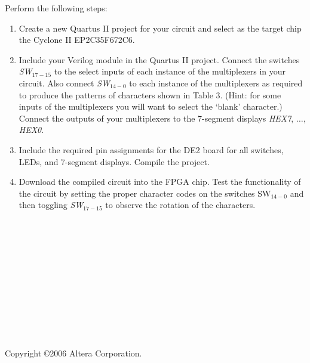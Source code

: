 \documentclass[psfig,10pt,fullpage]{article}
\begin{document}
Perform the following steps:
\begin{enumerate}
\item Create a new Quartus II project for your circuit and select as the target chip the 
Cyclone II EP2C35F672C6.
\item Include your Verilog module in the Quartus II project. Connect the switches 
{\it SW}$_{17-15}$ to the select inputs of each instance of the 
multiplexers in your circuit. Also connect {\it SW}$_{14-0}$ to each instance of the
multiplexers as required to produce the patterns of characters shown in Table 3. (Hint: for some
inputs of the multiplexers you will want to select the `blank' character.)
Connect the outputs of your multiplexers to the 7-segment displays {\it HEX7}, $\ldots$, 
{\it HEX0}.
\item Include the required pin assignments for the DE2 board for all switches, LEDs, 
and 7-segment displays. Compile the project.
\item Download the compiled circuit into the FPGA chip. Test the functionality of the 
circuit by setting the proper character codes on the switches SW$_{14-0}$ and then 
toggling {\it SW}$_{17-15}$ to observe the rotation of the characters.
\end{enumerate}

~\\
~\\
~\\
~\\
~\\
~\\
~\\
~\\
~\\
~\\
~\\
Copyright \copyright 2006 Altera Corporation. 
\end{document}
